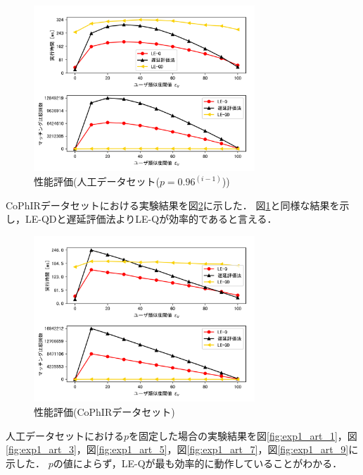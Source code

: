 \begin{figure}[H]
    \centering
    \includegraphics[width=8.3cm]{eimg/exp1.png}
    \caption{性能評価(人工データセット($p=0.96^{(i-1)}$))}
    \label{fig:exp1_art}
\end{figure}
CoPhIRデータセットにおける実験結果を図\ref{fig:exp1_cop}に示した．
図\ref{fig:exp1_art}と同様な結果を示し，LE-QDと遅延評価法よりLE-Qが効率的であると言える．

\begin{figure}[H]
    \centering
    \includegraphics[width=8.3cm]{eimg/exp1_c.png}
    \caption{性能評価(CoPhIRデータセット)}
    \label{fig:exp1_cop}
\end{figure}

人工データセットにおける$p$を固定した場合の実験結果を図\ref{fig:exp1_art_1}，図\ref{fig:exp1_art_3}，図\ref{fig:exp1_art_5}，図\ref{fig:exp1_art_7}，図\ref{fig:exp1_art_9}に示した．
$p$の値によらず，LE-Qが最も効率的に動作していることがわかる．

